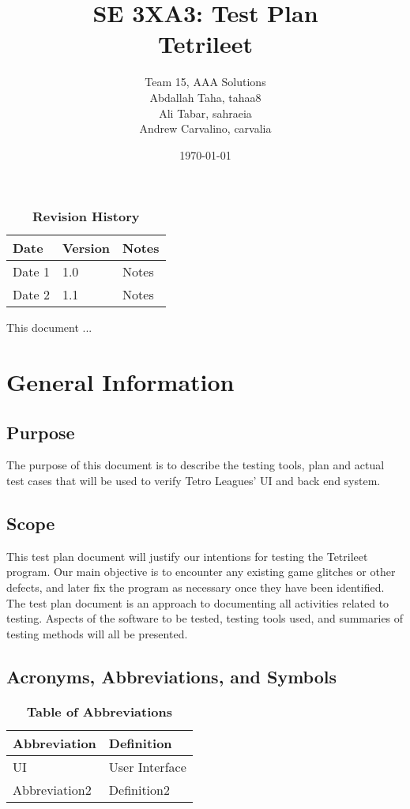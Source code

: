 \documentclass[12pt, titlepage]{article}
\title{SE 3XA3: Test Plan\\Tetrileet}
\author{Team 15, AAA Solutions
		\\ Abdallah Taha, tahaa8
		\\ Ali Tabar, sahraeia
		\\ Andrew Carvalino, carvalia
}
\date{\today}
\begin{document}
\maketitle

\tableofcontents
\listoftables
\listoffigures

\begin{table}[bp]
\caption{\bf Revision History}
\begin{tabularx}{\textwidth}{p{3cm}p{2cm}X}
\toprule {\bf Date} & {\bf Version} & {\bf Notes}\\
\midrule
Date 1 & 1.0 & Notes\\
Date 2 & 1.1 & Notes\\
\bottomrule
\end{tabularx}
\end{table}

\newpage


This document ...

\section{General Information}

\subsection{Purpose}
The purpose of this document is to describe the testing tools, plan and actual test cases that will be used to verify Tetro Leagues' UI and back end system.
\subsection{Scope}
This test plan document will justify our intentions for testing the Tetrileet program. Our main objective is to encounter any existing game glitches or other defects, and later fix the program as necessary once they have been identified.\\
The test plan document is an approach to documenting all activities related to testing. 
Aspects of the software to be tested, testing tools used, and summaries of testing methods will all be presented. 

\subsection{Acronyms, Abbreviations, and Symbols}
	
\begin{table}[hbp]
\caption{\textbf{Table of Abbreviations}} \label{Table}

\begin{tabularx}{\textwidth}{p{3cm}X}
\toprule
\textbf{Abbreviation} & \textbf{Definition} \\
\midrule
UI & User Interface\\
Abbreviation2 & Definition2\\
\bottomrule
\end{tabularx}

\end{table}
\end{document}
